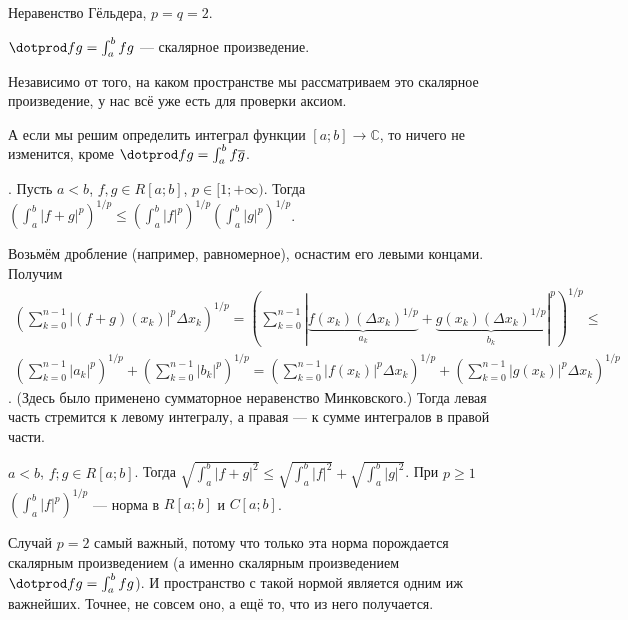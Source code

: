 \documentclass{article}
\begin{document}
\begin{itemize}
        \begin{Proof}
            Неравенство Гёльдера, $p=q=2$.
        \end{Proof}
        \thm $\dotprod fg=\int_a^bfg$ --- скалярное произведение.
        \begin{Proof}
            Независимо от того, на каком пространстве мы рассматриваем это скалярное произведение, у нас всё уже есть для проверки аксиом.
        \end{Proof}
        \begin{Comment}
            А если мы решим определить интеграл функции $[a;b]\to\mathbb C$, то ничего не изменится, кроме $\dotprod fg=\int_a^b f\overline g$.
        \end{Comment}
        \thm {}. Пусть $a<b$, $f,g\in R[a;b]$, $p\in[1;+\infty)$. Тогда $\left(\int_a^b|f+g|^p\right)^{1/p}\leqslant\left(\int_a^b|f|^p\right)^{1/p}\left(\int_a^b|g|^p\right)^{1/p}$.
        \begin{Proof}
            Возьмём дробление (например, равномерное), оснастим его левыми концами. Получим
            \[
            \begin{split}
                \left(\sum\limits_{k=0}^{n-1}|(f+g)(x_k)|^p\Delta x_k\right)^{1/p}=\left(\sum\limits_{k=0}^{n-1}|\underbrace{f(x_k)(\Delta x_k)^{1/p}}_{a_k}+\underbrace{g(x_k)(\Delta x_k)^{1/p}}_{b_k}|^p\right)^{1/p}\leqslant\\
                \left(\sum\limits_{k=0}^{n-1}|a_k|^p\right)^{1/p}+\left(\sum\limits_{k=0}^{n-1}|b_k|^p\right)^{1/p}=\left(\sum\limits_{k=0}^{n-1}|f(x_k)|^p\Delta x_k\right)^{1/p}+\left(\sum\limits_{k=0}^{n-1}|g(x_k)|^p\Delta x_k\right)^{1/p}
            \end{split}
            \]. (Здесь было применено сумматорное неравенство Минковского.) Тогда левая часть стремится к левому интегралу, а правая --- к сумме интегралов в правой части.
        \end{Proof}
        \thm $a<b$, $f;g\in R[a;b]$. Тогда $\sqrt{\int_a^b|f+g|^2}\leqslant\sqrt{\int_a^b|f|^2}+\sqrt{\int_a^b|g|^2}$.
        \thm При $p\geqslant1$ $\left(\int_a^b|f|^p\right)^{1/p}$ --- норма в $R[a;b]$ и $C[a;b]$.
        \begin{Comment}
            Случай $p=2$ самый важный, потому что только эта норма порождается скалярным произведением (а именно скалярным произведением $\dotprod fg=\int_a^bfg$). И пространство с такой нормой является одним иж важнейших. Точнее, не совсем оно, а ещё то, что из него получается.\\

\end{Comment}
\end{itemize}
\end{document}
